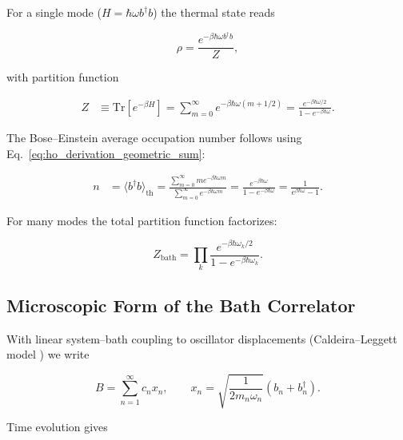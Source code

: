 \noindent
For a single mode ($H=\hbar \omega b^{\dagger} b$) the thermal state reads

\begin{equation} \label{eq:ho_single_mode_density_matrix}
	\rho = \frac{e^{-\beta \hbar \omega b^{\dagger} b}}{Z},
\end{equation}

\noindent
with partition function

\begin{align} \label{eq:ho_partition_function}
	Z & \equiv \mathrm{Tr}[e^{-\beta H}] = \sum_{m=0}^{\infty} e^{-\beta \hbar \omega (m+1/2)} = \frac{e^{-\beta \hbar \omega/2}}{1 - e^{-\beta \hbar \omega}}.
\end{align}

\noindent
The Bose--Einstein average occupation number follows using Eq.~\eqref{eq:ho_derivation_geometric_sum}:

\begin{align} \label{eq:ho_expectation_number_operator}
	n & = \langle b^{\dagger} b \rangle_{\text{th}} = \frac{\sum_{m=0}^{\infty} m e^{-\beta \hbar \omega m}}{\sum_{m=0}^{\infty} e^{-\beta \hbar \omega m}} = \frac{e^{-\beta \hbar \omega}}{1-e^{-\beta \hbar \omega}} = \frac{1}{e^{\beta \hbar \omega}-1}.
\end{align}

\noindent
For many modes the total partition function factorizes:

\begin{equation} \label{eq:ho_generalized_partition_function}
	Z_{\text{bath}} = \prod_k \frac{e^{-\beta \hbar \omega_k /2}}{1 - e^{-\beta \hbar \omega_k}}.
\end{equation}


\subsection{Microscopic Form of the Bath Correlator}
\label{subsec:microscopic_bath_correlator}

\noindent
With linear system--bath coupling to oscillator displacements (Caldeira--Leggett model \cite{hagstrommorrison2011caldeiraleggettmodel}) we write

\begin{equation} \label{eq:ho_bath_operator}
	B = \sum_{n=1}^{\infty} c_n x_n, \qquad x_n = \sqrt{\frac{1}{2 m_n \omega_n}} (b_n + b_n^{\dagger}).
\end{equation}

\noindent
Time evolution gives

